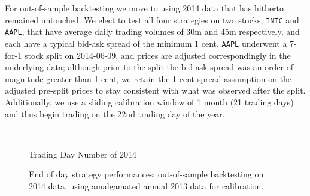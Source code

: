 For out-of-sample backtesting we move to using 2014 data that has hitherto remained untouched. We elect to test all four strategies on two stocks, \texttt{INTC} and \texttt{AAPL}, that have average daily trading volumes of 30m and 45m respectively, and each have a typical bid-ask spread of the minimum 1 cent. \texttt{AAPL} underwent a 7-for-1 stock split on 2014-06-09, and prices are adjusted correspondingly in the underlying data; although prior to the split the bid-ask spread was an order of magnitude greater than 1 cent, we retain the 1 cent spread assumption on the adjusted pre-split prices to stay consistent with what was observed after the split. Additionally, we use a sliding calibration window of 1 month (21 trading days) and thus begin trading on the 22nd trading day of the year. 

\begin{figure}
\centering
\begin{subfigure}{.45\linewidth}
  \centering
  \setlength\figureheight{\linewidth} 
  \setlength\figurewidth{\linewidth}
  
\end{subfigure}%
\hfill%
\begin{subfigure}{.45\linewidth}
  \centering
  \setlength\figureheight{\linewidth} 
  \setlength\figurewidth{\linewidth}
   
\end{subfigure}\\

\leavevmode{}\hspace{0pt plus 1filll}\null

Trading Day Number of 2014

\vspace{1cm}
\begin{subfigure}{\linewidth}
  \setlength\figureheight{\linewidth} 
  \setlength\figurewidth{\linewidth}
  \resizebox{\linewidth}{!}{}
\end{subfigure}%
  \caption{End of day strategy performances: out-of-sample backtesting on 2014 data, using amalgamated annual 2013 data for calibration.}
  \label{fig:OOS_annual_comp}
\end{figure}

